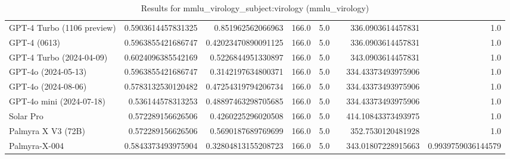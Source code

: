 \begin{table}[htp]
{\begin{tabular}{lrrrrrrr}
GPT-4 Turbo (1106 preview) & 0.5903614457831325 & 0.851962562066963 & 166.0 & 5.0 &  & 336.0903614457831 & 1.0 \\
GPT-4 (0613) & 0.5963855421686747 & 0.42023470890091125 & 166.0 & 5.0 &  & 336.0903614457831 & 1.0 \\
GPT-4 Turbo (2024-04-09) & 0.6024096385542169 & 0.5226844951330897 & 166.0 & 5.0 &  & 343.0903614457831 & 1.0 \\
GPT-4o (2024-05-13) & 0.5963855421686747 & 0.3142197634800371 & 166.0 & 5.0 &  & 334.43373493975906 & 1.0 \\
GPT-4o (2024-08-06) & 0.5783132530120482 & 0.47254319794206734 & 166.0 & 5.0 &  & 334.43373493975906 & 1.0 \\
GPT-4o mini (2024-07-18) & 0.536144578313253 & 0.48897463298705685 & 166.0 & 5.0 &  & 334.43373493975906 & 1.0 \\
Solar Pro & 0.572289156626506 & 0.4260225296020508 & 166.0 & 5.0 &  & 414.10843373493975 & 1.0 \\
Palmyra X V3 (72B) & 0.572289156626506 & 0.5690187689769699 & 166.0 & 5.0 &  & 352.7530120481928 & 1.0 \\
Palmyra-X-004 & 0.5843373493975904 & 0.32804813155208723 & 166.0 & 5.0 &  & 343.01807228915663 & 0.9939759036144579 \\
\bottomrule
\end{tabular}}
\caption{Results for mmlu_virology_subject:virology (mmlu_virology)}
\label{fig:mmlu_virology_subject:virology (mmlu_virology)}
\end{table}